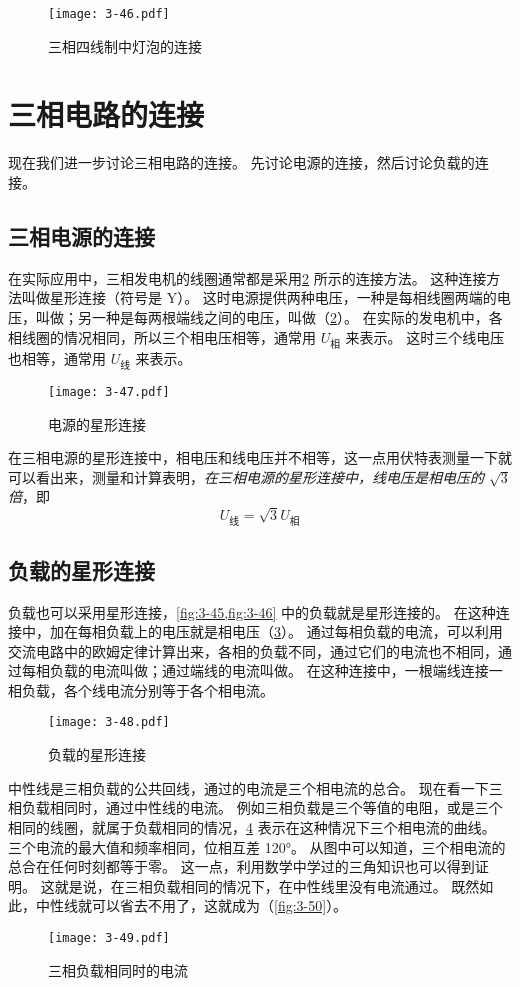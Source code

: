 \begin{figure}
  \texttt{[image: 3-46.pdf]}
  \caption{三相四线制中灯泡的连接}\label{fig:3-46}
\end{figure}

\section{三相电路的连接}
现在我们进一步讨论三相电路的连接。
先讨论电源的连接，然后讨论负载的连接。

\subsection{三相电源的连接}

在实际应用中，三相发电机的线圈通常都是采用\cref{fig:3-47} 所示的连接方法。
这种连接方法叫做星形连接（符号是 Y）。
这时电源提供两种电压，一种是每相线圈两端的电压，叫做；另一种是每两根端线之间的电压，叫做（\cref{fig:3-47}）。
在实际的发电机中，各相线圈的情况相同，所以三个相电压相等，通常用 $U_{\text{相}}$ 来表示。
这时三个线电压也相等，通常用 $U_{\text{线}}$ 来表示。
\begin{figure}
  \texttt{[image: 3-47.pdf]}
  \caption{电源的星形连接}\label{fig:3-47}
\end{figure}

在三相电源的星形连接中，相电压和线电压并不相等，这一点用伏特表测量一下就可以看出来，测量和计算表明，\emph{在三相电源的星形连接中，线电压是相电压的 $\sqrt{3}$ 倍}，即
\[U_{\text{线}}=\sqrt{3}U_{\text{相}}\]

\subsection{负载的星形连接}
负载也可以采用星形连接，\cref{fig:3-45,fig:3-46} 中的负载就是星形连接的。
在这种连接中，加在每相负载上的电压就是相电压（\cref{fig:3-48}）。
通过每相负载的电流，可以利用交流电路中的欧姆定律计算出来，各相的负载不同，通过它们的电流也不相同，通过每相负载的电流叫做；通过端线的电流叫做。
在这种连接中，一根端线连接一相负载，各个线电流分别等于各个相电流。
\begin{figure}
  \texttt{[image: 3-48.pdf]}
  \caption{负载的星形连接}\label{fig:3-48}
\end{figure}

中性线是三相负载的公共回线，通过的电流是三个相电流的总合。
现在看一下三相负载相同时，通过中性线的电流。
例如三相负载是三个等值的电阻，或是三个相同的线圈，就属于负载相同的情况，\cref{fig:3-49} 表示在这种情况下三个相电流的曲线。
三个电流的最大值和频率相同，位相互差 \ang{120}。
从图中可以知道，三个相电流的总合在任何时刻都等于零。
这一点，利用数学中学过的三角知识也可以得到证明。
这就是说，在三相负载相同的情况下，在中性线里没有电流通过。
既然如此，中性线就可以省去不用了，这就成为（\cref{fig:3-50}）。
\begin{figure}
  \texttt{[image: 3-49.pdf]}
  \caption{三相负载相同时的电流}\label{fig:3-49}
\end{figure}

